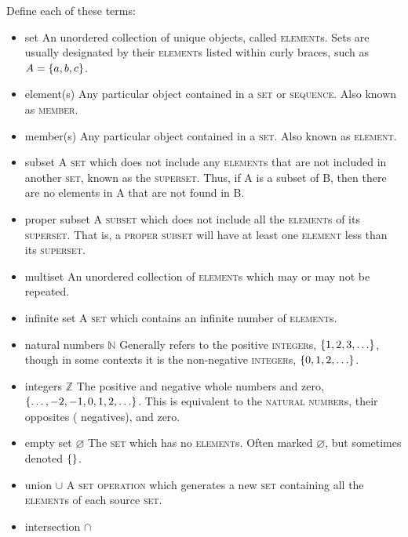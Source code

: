 \documentclass{article}
\newcommand{\term}[1]{\textsc{#1}}
\begin{document}

\large

Define each of these terms:

\bigskip \indent
\begin{itemize}
\item set
  \subitem An unordered collection of unique objects, called \term{element}s.  Sets are usually designated by their \term{element}s listed within curly braces, such as $A=\set{a,b,c}$.
\item element(s)
  \subitem Any particular object contained in a \term{set} or \term{sequence}.
  Also known as \term{member}.
\item member(s)
  \subitem Any particular object contained in a \term{set}.
  Also known as \term{element}.
\item subset
  \subitem A \term{set} which does not include any \term{element}s that are not included in another \term{set}, known as the \term{superset}.  Thus, if \term{A} is a subset of \term{B}, then there are no elements in \term{A} that are not found in \term{B}.
\item proper subset
  \subitem A \term{subset} which does not include all the \term{element}s of its \term{superset}.  That is, a \term{proper subset} will have at least one \term{element} less than its \term{superset}.
\item multiset
  \subitem An unordered collection of \term{element}s which may or may not be repeated.
\item infinite set
  \subitem A \term{set} which contains an infinite number of \term{element}s.
\item natural numbers $\mathbb{N}$
  \subitem Generally refers to the positive \term{integer}s, $\set{1,2,3,\ldots}$, though in some contexts it is the non-negative \term{integer}s, $\set{0,1,2, \ldots}$.
\item integers $\mathbb{Z}$
  \subitem The positive and negative whole numbers and zero, $\set{\ldots,-2,-1,0,1,2,\ldots}$.  This is equivalent to the \term{natural number}s, their opposites ({\ie} negatives), and zero.
\item empty set $\varnothing$
  \subitem The \term{set} which has no \term{element}s.  Often marked $\varnothing$, but sometimes denoted $\set{}$.
\item union $\cup$
  \subitem A \term{set operation} which generates a new \term{set} containing all the \term{element}s of each source \term{set}.
\item intersection $\cap$

\end{itemize}
\end{document}
